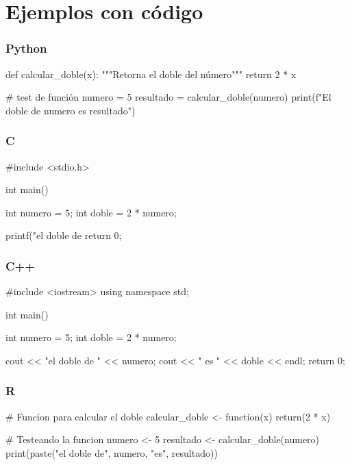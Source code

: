 \section{Ejemplos con código} 

\begin{frame}[fragile]
    \frametitle{Python}
    
    \begin{python}
def calcular_doble(x):
    """Retorna el doble del número"""
    return 2 * x

# test de función
numero = 5
resultado = calcular_doble(numero)
print(f"El doble de {numero} es {resultado}")
    \end{python}
\end{frame}

\begin{frame}[fragile]
    \frametitle{C}
    
    \begin{clang}
#include <stdio.h>

int main() {
    int numero = 5;
    int doble = 2 * numero;
    
    printf("el doble de %
    return 0;
}
    \end{clang}
\end{frame}

\begin{frame}[fragile]
    \frametitle{C++}
    
    \begin{cpp}
#include <iostream>
using namespace std;

int main() {
    int numero = 5;
    int doble = 2 * numero;
    
    cout << "el doble de " << numero;
    cout << " es " << doble << endl;
    return 0;
}
    \end{cpp}
\end{frame}

\begin{frame}[fragile]
    \frametitle{R}
    
    \begin{rlang}
# Funcion para calcular el doble
calcular_doble <- function(x) {
  return(2 * x)
}

# Testeando la funcion
numero <- 5
resultado <- calcular_doble(numero)
print(paste("el doble de", numero, "es", resultado))
    \end{rlang}
\end{frame}

